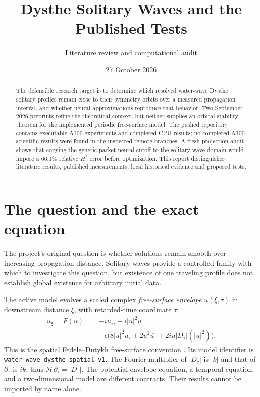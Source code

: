 \documentclass[11pt]{article}
\title{Dysthe Solitary Waves and the Published Tests}
\author{Literature review and computational audit}
\date{27 October 2026}
\newcommand{\absD}{\lvert D_\tau\rvert}
\newcommand{\model}{\texttt{water-\allowbreak wave-\allowbreak dysthe-\allowbreak spatial-v1}}
\begin{document}
\maketitle
\begin{abstract}
The defensible research target is to determine which resolved water-wave
Dysthe solitary profiles remain close to their symmetry orbits over a measured
propagation interval, and whether neural approximations reproduce that behavior.
Two September 2026 preprints refine the theoretical context, but neither supplies
an orbital-stability theorem for the implemented periodic free-surface model.
The pushed repository contains executable A100 experiments and completed CPU
results; no completed A100 scientific results were found in the inspected remote
branches. A fresh projection audit shows that copying the generic-packet neural
cutoff to the solitary-wave domain would impose a 66.1\% relative $H^2$ error
before optimization. This report distinguishes literature results, published
measurements, local historical evidence and proposed tests.
\end{abstract}

\section{The question and the exact equation}
The project's original question is whether solutions remain smooth over
increasing propagation distance. Solitary waves provide a controlled family
with which to investigate this question, but existence of one traveling profile
does not establish global existence for arbitrary initial data.

The active model evolves a scaled complex \emph{free-surface envelope}
$u(\xi,\tau)$ in downstream distance $\xi$, with retarded-time coordinate $\tau$:
\begin{equation}\label{eq:dysthe}
\begin{aligned}
u_\xi=F(u)={}&-iu_{\tau\tau}-i|u|^2u\\
&-\epsilon\bigl(8|u|^2u_\tau+2u^2\overline{u_\tau}
               +2iu\absD(|u|^2)\bigr).
\end{aligned}
\end{equation}
This is the spatial Fedele--Dutykh free-surface convention \cite{fd}.
Its model identifier is \model. The Fourier multiplier of $\absD$ is $|k|$ and that of
$\partial_\tau$ is $ik$; thus $\mathcal H\partial_\tau=\absD$.
The potential-envelope equation, a temporal equation, and a two-dimensional
model are different contracts. Their results cannot be imported by name alone.
\end{document}
